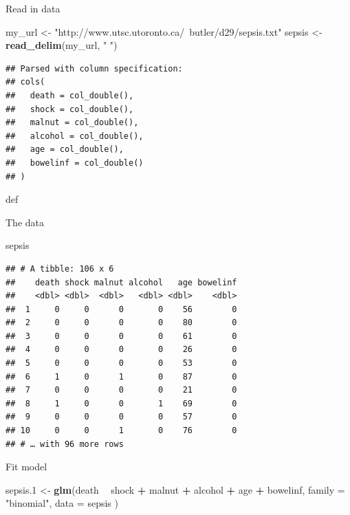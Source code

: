 \documentclass[ignorenonframetext,]{beamer}
\newenvironment{Shaded}{\begin{snugshade}}{\end{snugshade}}
\newcommand{\DataTypeTok}[1]{\textcolor[rgb]{0.13,0.29,0.53}{#1}}
\newcommand{\FloatTok}[1]{\textcolor[rgb]{0.00,0.00,0.81}{#1}}
\newcommand{\KeywordTok}[1]{\textcolor[rgb]{0.13,0.29,0.53}{\textbf{#1}}}
\newcommand{\NormalTok}[1]{#1}
\newcommand{\OperatorTok}[1]{\textcolor[rgb]{0.81,0.36,0.00}{\textbf{#1}}}
\newcommand{\StringTok}[1]{\textcolor[rgb]{0.31,0.60,0.02}{#1}}
\begin{document}
\begin{frame}[fragile]{Read in data}
\protect\hypertarget{read-in-data}{}

\begin{Shaded}
\begin{Highlighting}[]
\NormalTok{my_url <-}\StringTok{ "http://www.utsc.utoronto.ca/~butler/d29/sepsis.txt"}
\NormalTok{sepsis <-}\StringTok{ }\KeywordTok{read_delim}\NormalTok{(my_url, }\StringTok{" "}\NormalTok{)}
\end{Highlighting}
\end{Shaded}

\begin{verbatim}
## Parsed with column specification:
## cols(
##   death = col_double(),
##   shock = col_double(),
##   malnut = col_double(),
##   alcohol = col_double(),
##   age = col_double(),
##   bowelinf = col_double()
## )
\end{verbatim}

def

\end{frame}

\begin{frame}[fragile]{The data}
\protect\hypertarget{the-data-2}{}

\begin{Shaded}
\begin{Highlighting}[]
\NormalTok{sepsis}
\end{Highlighting}
\end{Shaded}

\begin{verbatim}
## # A tibble: 106 x 6
##    death shock malnut alcohol   age bowelinf
##    <dbl> <dbl>  <dbl>   <dbl> <dbl>    <dbl>
##  1     0     0      0       0    56        0
##  2     0     0      0       0    80        0
##  3     0     0      0       0    61        0
##  4     0     0      0       0    26        0
##  5     0     0      0       0    53        0
##  6     1     0      1       0    87        0
##  7     0     0      0       0    21        0
##  8     1     0      0       1    69        0
##  9     0     0      0       0    57        0
## 10     0     0      1       0    76        0
## # … with 96 more rows
\end{verbatim}

\end{frame}

\begin{frame}[fragile]{Fit model}
\protect\hypertarget{fit-model}{}

\begin{Shaded}
\begin{Highlighting}[]
\NormalTok{sepsis}\FloatTok{.1}\NormalTok{ <-}\StringTok{ }\KeywordTok{glm}\NormalTok{(death }\OperatorTok{~}\StringTok{ }\NormalTok{shock }\OperatorTok{+}\StringTok{ }\NormalTok{malnut }\OperatorTok{+}\StringTok{ }\NormalTok{alcohol }\OperatorTok{+}\StringTok{ }\NormalTok{age }\OperatorTok{+}
\StringTok{  }\NormalTok{bowelinf,}
\DataTypeTok{family =} \StringTok{"binomial"}\NormalTok{,}
\DataTypeTok{data =}\NormalTok{ sepsis}
\NormalTok{)}
\end{Highlighting}
\end{Shaded}

\end{frame}
\end{document}

